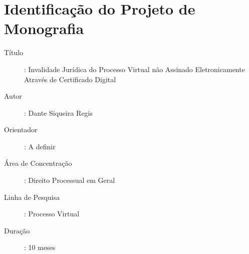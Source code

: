 \chapter{Identificação do Projeto de Monografia}

\begin{description}
\item[Título]: Invalidade Jurídica do Processo Virtual não Assinado Eletronicamente Através de Certificado Digital\par
\item[Autor]: Dante Siqueira Regis\par
\item[Orientador]: A definir\par
\item[Área de Concentração]: Direito Processual em Geral\par
\item[Linha de Pesquisa]: Processo Virtual\par
\item[Duração]: 10 meses
\end{description}
